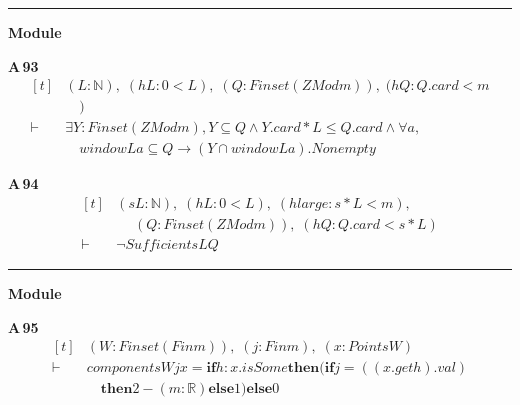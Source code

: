\vspace{4pt}\noindent\rule{\columnwidth}{0.4pt}\par\vspace{2pt}
\noindent\textbf{Module }\par\vspace{3pt}

\noindent\textbf{A\,93}\quad{}
{\footnotesize\[ \begin{aligned}[t]
&(\mathit{L} : \mathbb{N} ),\; (\mathit{hL} : 0<\mathit{L}),\; (\mathit{Q} : \mathit{Finset} (\mathit{ZMod} \mathit{m})),\; (\mathit{hQ} : \mathit{Q}.\mathit{card}< \mathit{m}\\
&\quad )\\
\vdash\;&\exists \mathit{Y} : \mathit{Finset} (\mathit{ZMod} \mathit{m}),\mathit{Y} \subseteq \mathit{Q} \wedge \mathit{Y}.\mathit{card}*\mathit{L} \leq \mathit{Q}.\mathit{card} \wedge \forall \mathit{a},\\
&\quad \mathit{window} \mathit{L} \mathit{a} \subseteq \mathit{Q} \to (\mathit{Y} \cap \mathit{window} \mathit{L} \mathit{a}).\mathit{Nonempty}
\end{aligned} \]}

\noindent\textbf{A\,94}\quad{}
{\footnotesize\[ \begin{aligned}[t]
&(\mathit{s} \mathit{L} : \mathbb{N} ),\; (\mathit{hL} : 0<\mathit{L}),\; (\mathit{hlarge} : \mathit{s}*\mathit{L}< \mathit{m}),\\
&\quad \; (\mathit{Q} : \mathit{Finset} (\mathit{ZMod} \mathit{m})),\; (\mathit{hQ} : \mathit{Q}.\mathit{card}<\mathit{s}*\mathit{L})\\
\vdash\;&\neg \mathit{Sufficient} \mathit{s} \mathit{L} \mathit{Q}
\end{aligned} \]}

\vspace{4pt}\noindent\rule{\columnwidth}{0.4pt}\par\vspace{2pt}
\noindent\textbf{Module }\par\vspace{3pt}

\noindent\textbf{A\,95}\quad{}
{\footnotesize\[ \begin{aligned}[t]
&(\mathit{W} : \mathit{Finset} (\mathit{Fin} \mathit{m})),\; (\mathit{j} : \mathit{Fin} \mathit{m}),\; (\mathit{x} : \mathit{Points} \mathit{W})\\
\vdash\;&\mathit{components} \mathit{W} \mathit{j} \mathit{x} = \mathbf{if} \mathit{h} : \mathit{x}.\mathit{isSome} \mathbf{then} (\mathbf{if} \mathit{j} = ((\mathit{x}.\mathit{get} \mathit{h}).\mathit{val})\\
&\quad \mathbf{then} 2-(\mathit{m}:\mathbb{R} ) \mathbf{else} 1) \mathbf{else} 0
\end{aligned} \]}

